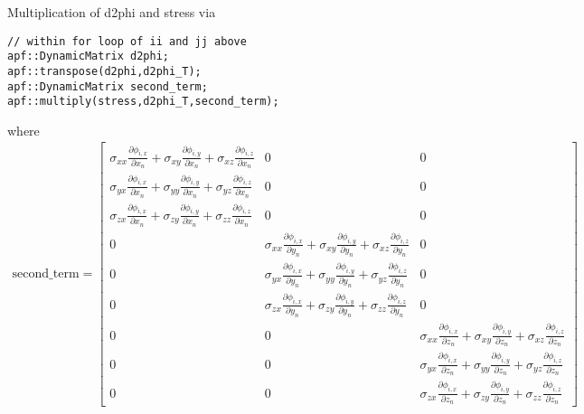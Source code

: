 Multiplication of d2phi and stress via
%
\begin{lstlisting}
// within for loop of ii and jj above
apf::DynamicMatrix d2phi;
apf::transpose(d2phi,d2phi_T);
apf::DynamicMatrix second_term;
apf::multiply(stress,d2phi_T,second_term);
\end{lstlisting}
%
where
%
\begin{eqnarray}
\text{second\_term} =
\begin{bmatrix}
\sigma_{xx}\frac{\partial \phi_{i,x}}{\partial x_n} +\sigma_{xy} \frac{\partial \phi_{i,y}}{\partial x_n}  + \sigma_{xz} \frac{\partial \phi_{i,z}}{\partial x_n} & 0 & 0 \\
%
\sigma_{yx}\frac{\partial \phi_{i,x}}{\partial x_n} +\sigma_{yy} \frac{\partial \phi_{i,y}}{\partial x_n}  + \sigma_{yz} \frac{\partial \phi_{i,z}}{\partial x_n} & 0 & 0 \\
%
\sigma_{zx}\frac{\partial \phi_{i,x}}{\partial x_n} +\sigma_{zy} \frac{\partial \phi_{i,y}}{\partial x_n}  + \sigma_{zz} \frac{\partial \phi_{i,z}}{\partial x_n} & 0 & 0 \\
0 & \sigma_{xx}\frac{\partial \phi_{i,x}}{\partial y_n} +\sigma_{xy} \frac{\partial \phi_{i,y}}{\partial y_n}  + \sigma_{xz} \frac{\partial \phi_{i,z}}{\partial y_n}  & 0 \\
%
0 & \sigma_{yx}\frac{\partial \phi_{i,x}}{\partial y_n} +\sigma_{yy} \frac{\partial \phi_{i,y}}{\partial y_n}  + \sigma_{yz} \frac{\partial \phi_{i,z}}{\partial y_n}  & 0 \\
%
0 & \sigma_{zx}\frac{\partial \phi_{i,x}}{\partial y_n} +\sigma_{zy} \frac{\partial \phi_{i,y}}{\partial y_n}  + \sigma_{zz} \frac{\partial \phi_{i,z}}{\partial y_n}  & 0 \\
0 & 0 & \sigma_{xx}\frac{\partial \phi_{i,x}}{\partial z_n} +\sigma_{xy} \frac{\partial \phi_{i,y}}{\partial z_n}  + \sigma_{xz} \frac{\partial \phi_{i,z}}{\partial z_n}      \\
%
0 & 0 & \sigma_{yx}\frac{\partial \phi_{i,x}}{\partial z_n} +\sigma_{yy} \frac{\partial \phi_{i,y}}{\partial z_n}  + \sigma_{yz} \frac{\partial \phi_{i,z}}{\partial z_n}      \\
%
0 & 0 & \sigma_{zx}\frac{\partial \phi_{i,x}}{\partial z_n} +\sigma_{zy} \frac{\partial \phi_{i,y}}{\partial z_n}  + \sigma_{zz} \frac{\partial \phi_{i,z}}{\partial z_n}   
\end{bmatrix} \nonumber\\
\end{eqnarray}

%

